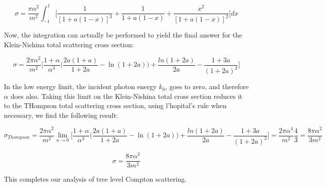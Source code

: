 \documentclass[a4]{article}
\begin{document}
    \begin{equation}
        \sigma = \frac{\pi \alpha^2}{m^2} \int_{-1}^{1} \Big[  \frac{1}{[1 + a (1 - x)]^3} + \frac{1}{1 + a (1 - x)} + \frac{x^2}{[1 + a(1 - x)]^2} \Big] dx
    \end{equation}

    Now, the integration can actually be performed to yield the final answer for the Klein-Nishina total scattering cross section:

    \begin{framed}
        \begin{equation}
            \sigma = \frac{2 \pi \alpha^2}{m^2} \Big[ \frac{1 + \alpha}{\alpha^3} \big( \frac{2a (1 + a)}{1 + 2a} - \ln (1 + 2a) \big) + \frac{ln (1 + 2a)}{2a} - \frac{1 + 3a}{(1 + 2a)^2} \Big]
        \end{equation}
    \end{framed}

    In the low energy limit, the incident photon energy $k_0$, goes to zero, and therefore $\alpha$ does also. Taking this limit on the Klein-Nishina total cross section reduces it to the THompson total scattering
    cross section, using l'hopital's rule when necessary, we find the following result:

    \begin{equation}
        \sigma_{Thompson} = \frac{2 \pi \alpha^2}{m^2} \lim_{a \rightarrow 0} \Big[ \frac{1 + \alpha}{\alpha^3} \big( \frac{2a (1 + a)}{1 + 2a} - \ln (1 + 2a) \big) + \frac{ln (1 + 2a)}{2a} - \frac{1 + 3a}{(1 + 2a)^2} \Big] = \frac{2 \pi \alpha^4}{m^2} \frac{4}{3} = \frac{8 \pi \alpha^2}{3 m^2}
    \end{equation}

    \begin{framed}
        \begin{equation}
            \sigma = \frac{8 \pi \alpha^2}{3 m^2}
        \end{equation}
    \end{framed}

    This completes our analysis of tree level Compton scattering.
\end{document}
